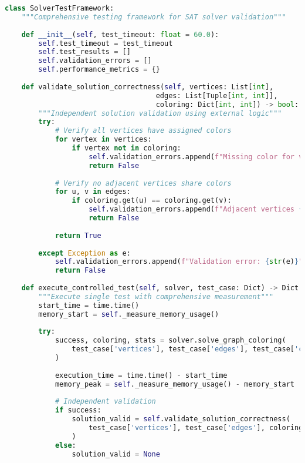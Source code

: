 \begin{lstlisting}[language=Python, caption=Core Testing Framework Implementation]
class SolverTestFramework:
    """Comprehensive testing framework for SAT solver validation"""
    
    def __init__(self, test_timeout: float = 60.0):
        self.test_timeout = test_timeout
        self.test_results = []
        self.validation_errors = []
        self.performance_metrics = {}
    
    def validate_solution_correctness(self, vertices: List[int], 
                                    edges: List[Tuple[int, int]], 
                                    coloring: Dict[int, int]) -> bool:
        """Independent solution validation using external logic"""
        try:
            # Verify all vertices have assigned colors
            for vertex in vertices:
                if vertex not in coloring:
                    self.validation_errors.append(f"Missing color for vertex {vertex}")
                    return False
            
            # Verify no adjacent vertices share colors
            for u, v in edges:
                if coloring.get(u) == coloring.get(v):
                    self.validation_errors.append(f"Adjacent vertices {u}, {v} have same color")
                    return False
            
            return True
            
        except Exception as e:
            self.validation_errors.append(f"Validation error: {str(e)}")
            return False
    
    def execute_controlled_test(self, solver, test_case: Dict) -> Dict:
        """Execute single test with comprehensive measurement"""
        start_time = time.time()
        memory_start = self._measure_memory_usage()
        
        try:
            success, coloring, stats = solver.solve_graph_coloring(
                test_case['vertices'], test_case['edges'], test_case['colors']
            )
            
            execution_time = time.time() - start_time
            memory_peak = self._measure_memory_usage() - memory_start
            
            # Independent validation
            if success:
                solution_valid = self.validate_solution_correctness(
                    test_case['vertices'], test_case['edges'], coloring
                )
            else:
                solution_valid = None
            

\end{lstlisting}
